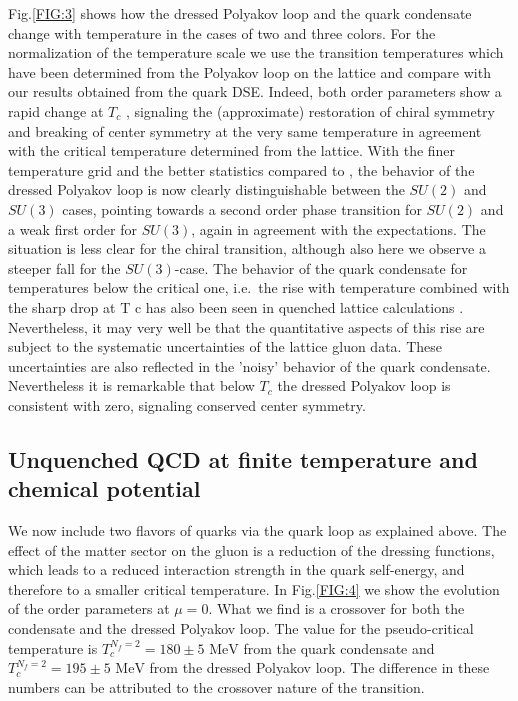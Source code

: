 \documentclass[a4paper,fleqn]{cls/cas-dc}
\begin{document}
Fig.\ref{FIG:3} shows how the dressed Polyakov loop and the quark condensate change with temperature in the cases of two
and three colors. For the normalization of the temperature scale we use the transition temperatures which have been
determined from the Polyakov loop on the lattice and compare with our results obtained from the quark DSE. Indeed, both
order parameters show a rapid change at $T_c$ , signaling the (approximate) restoration of chiral symmetry and breaking of
center symmetry at the very same temperature in agreement with the critical temperature determined from the lattice.
With the finer temperature grid and the better statistics compared to \cite{Fischer2010}, the behavior of the dressed Polyakov loop is now
clearly distinguishable between the $SU ( 2 )$ and $SU ( 3 )$ cases, pointing towards a second order phase transition for $SU ( 2 )$ and
a weak first order for $SU ( 3 )$, again in agreement with the expectations. The situation is less clear for the chiral transition,
although also here we observe a steeper fall for the $SU ( 3 )$-case. The behavior of the quark condensate for temperatures
below the critical one, i.e.\ the rise with temperature combined with the sharp drop at T c has also been seen in quenched
lattice calculations \cite{PhysRevD.78.074505}. Nevertheless, it may very well be that the quantitative aspects of this rise are subject to the
systematic uncertainties of the lattice gluon data. These uncertainties are also reflected in the 'noisy' behavior of the
quark condensate. Nevertheless it is remarkable that below $T_c$ the dressed Polyakov loop is consistent with zero, signaling
conserved center symmetry.

\subsection{Unquenched QCD at finite temperature and chemical potential}
We now include two flavors of quarks via the quark loop as explained above. The effect of the matter sector on the
gluon is a reduction of the dressing functions, which leads to a reduced interaction strength in the quark self-energy, and
therefore to a smaller critical temperature. In Fig.\ref{FIG:4} we show the evolution of the order parameters at $\mu = 0$. What we
find is a crossover for both the condensate and the dressed Polyakov loop. The value for the pseudo-critical temperature is
$T_c^{N_f = 2} = 180 \pm 5 \text{ MeV}$ from the quark condensate and 
$T_c^{N_f = 2} = 195 \pm 5 \text{ MeV}$ from the dressed Polyakov loop. The difference
in these numbers can be attributed to the crossover nature of the transition.
\end{document}
